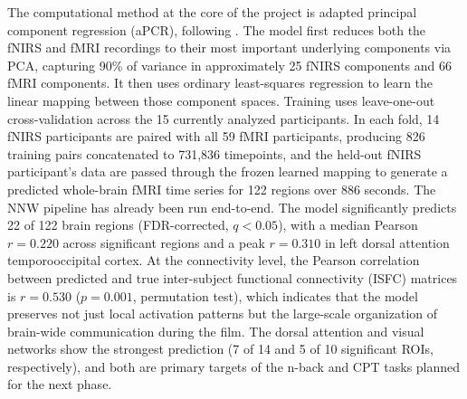 The computational method at the core of the project is adapted principal component
regression (aPCR), following \textcite{gao2025}. The model first reduces both the fNIRS
and fMRI recordings to their most important underlying components via PCA, capturing 90\%
of variance in approximately 25 fNIRS components and 66 fMRI components. It then uses
ordinary least-squares regression to learn the linear mapping between those component
spaces. Training uses leave-one-out cross-validation across the 15 currently analyzed
participants. In each fold, 14 fNIRS participants are paired with all 59 fMRI
participants, producing 826 training pairs concatenated to 731,836 timepoints, and the
held-out fNIRS participant's data are passed through the frozen learned mapping to
generate a predicted whole-brain fMRI time series for 122 regions over 886 seconds.
The NNW pipeline has already been run end-to-end. The model significantly predicts
22 of 122 brain regions (FDR-corrected, $q < 0.05$), with a median Pearson $r = 0.220$
across significant regions and a peak $r = 0.310$ in left dorsal attention
temporooccipital cortex. At the connectivity level, the Pearson correlation between
predicted and true inter-subject functional connectivity (ISFC) matrices is $r = 0.530$
($p = 0.001$, permutation test), which indicates that the model preserves not just local
activation patterns but the large-scale organization of brain-wide communication during
the film. The dorsal attention and visual networks show the strongest prediction (7 of 14
and 5 of 10 significant ROIs, respectively), and both are primary targets of the n-back
and CPT tasks planned for the next phase.

